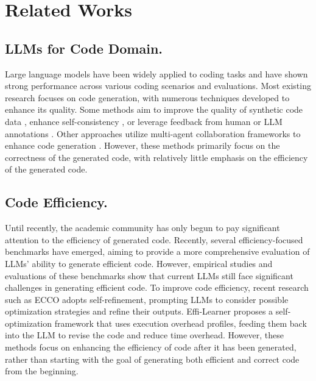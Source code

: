 \section{Related Works}
\subsection{LLMs for Code Domain.}
Large language models have been widely applied to coding tasks and have shown strong performance across various coding scenarios and evaluations. Most existing research focuses on code generation, with numerous techniques developed to enhance its quality. Some methods aim to improve the quality of synthetic code data \cite{wei2024magicoder, luo2024wizardcoder, lei2024autocoder}, enhance self-consistency \cite{le2024codechain, huang-etal-2024-enhancing}, or leverage feedback from human or LLM annotations \cite{chen2024improvingcodegenerationtraining, wu2023finegrained, tang-etal-2023-explain}. Other approaches utilize multi-agent collaboration frameworks to enhance code generation \cite{zhong2024debug, shinn2023reflexion, islam-etal-2024-mapcoder, madaan2023selfrefine, li2024codetreeagentguidedtreesearch}. However, these methods primarily focus on the correctness of the generated code, with relatively little emphasis on the efficiency of the generated code.

\subsection{Code Efficiency.}
Until recently, the academic community has only begun to pay significant attention to the efficiency of generated code. Recently, several efficiency-focused benchmarks \cite{EffiBench, du2024mercury, liu2024evaluatinglanguagemodelsefficient, qiu2024efficientllmgeneratedcoderigorous} have emerged, aiming to provide a more comprehensive evaluation of LLMs’ ability to generate efficient code. However, empirical studies and evaluations of these benchmarks show that current LLMs still face significant challenges in generating efficient code. To improve code efficiency, recent research such as ECCO \cite{waghjale-etal-2024-ecco} adopts self-refinement, prompting LLMs to consider possible optimization strategies and refine their outputs. Effi-Learner \cite{EffiLearner} proposes a self-optimization framework that uses execution overhead profiles, feeding them back into the LLM to revise the code and reduce time overhead. However, these methods focus on enhancing the efficiency of code after it has been generated, rather than starting with the goal of generating both efficient and correct code from the beginning.